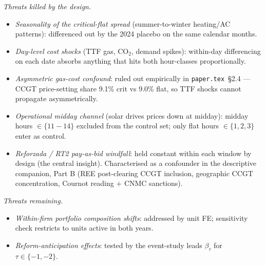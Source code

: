 \documentclass[11pt,a4paper]{article}
\newcommand{\code}[1]{\nolinkurl{#1}}
\begin{document}
\textit{Threats killed by the design.}
\begin{itemize}
   \item \emph{Seasonality of the critical-flat spread} (summer-to-winter heating/AC patterns): differenced out by the 2024 placebo on the same calendar months.
   \item \emph{Day-level cost shocks} (TTF gas, CO$_2$, demand spikes): within-day differencing on each date absorbs anything that hits both hour-classes proportionally.
   \item \emph{Asymmetric gas-cost confound}: ruled out empirically in \code{paper.tex}~\S2.4 --- CCGT price-setting share 9.1\% crit vs 9.0\% flat, so TTF shocks cannot propagate asymmetrically.
   \item \emph{Operational midday channel} (solar drives prices down at midday): midday hours $\in \{11\!-\!14\}$ excluded from the control set; only flat hours $\in \{1,2,3\}$ enter as control.
   \item \emph{Reforzada / RT2 pay-as-bid windfall}: held constant within each window by design (the central insight). Characterised as a confounder in the descriptive companion, Part B (REE post-clearing CCGT inclusion, geographic CCGT concentration, Cournot reading $+$ CNMC sanctions).
\end{itemize}

\textit{Threats remaining.}
\begin{itemize}
   \item \emph{Within-firm portfolio composition shifts}: addressed by unit FE; sensitivity check restricts to units active in both years.
   \item \emph{Reform-anticipation effects}: tested by the event-study leads $\beta_\tau$ for $\tau \in \{-1, -2\}$.
\end{itemize}
\end{document}
